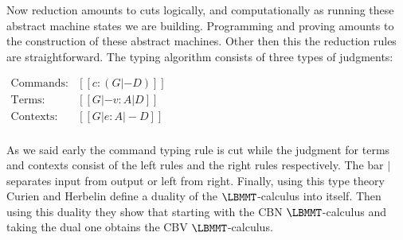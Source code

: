 Now reduction amounts to cuts logically, and computationally as running
these abstract machine states we are building.  Programming and proving
amounts to the construction of these abstract machines.  Other then
this the reduction rules are straightforward. The typing algorithm
consists of three types of judgments:
\begin{center}
  \begin{math}
    \begin{array}{lll}
      \text{Commands:} & [[c : (G |- D)]]\\
      \text{Terms:} & [[G |- v : A | D]]\\
      \text{Contexts:} & [[G | e : A |- D]]\\
    \end{array}
  \end{math}
\end{center}
As we said early the command typing rule is cut while the judgment for
terms and contexts consist of the left rules and the right rules
respectively.  The bar $|$ separates input from output or left from
right.  Finally, using this type theory Curien and Herbelin define a
duality of the $\LBMMT$-calculus into itself.  Then using this duality
they show that starting with the CBN $\LBMMT$-calculus and taking the
dual one obtains the CBV $\LBMMT$-calculus.

